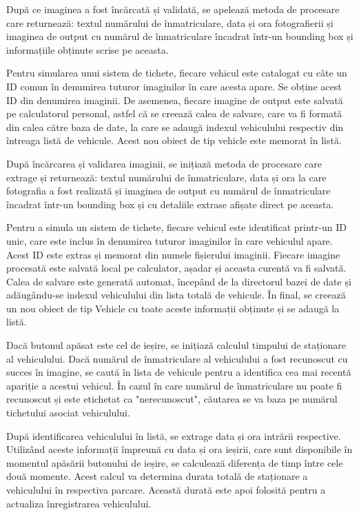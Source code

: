 \documentclass[a4paper,12pt]{report}
\begin{document}
După ce imaginea a fost încărcată și validată, se apelează metoda de procesare care returnează: textul numărului de înmatriculare, data și ora fotografierii și imaginea de output cu numărul de înmatriculare încadrat într-un bounding box și informațiile obținute scrise pe aceasta.

Pentru simularea unui sistem de tichete, fiecare vehicul este catalogat cu câte un ID comun în denumirea tuturor imaginilor în care acesta apare. Se obține acest ID din denumirea imaginii. De asemenea, fiecare imagine de output este salvată pe calculatorul personal, astfel că se creează calea de salvare, care va fi formată din calea către baza de date, la care se adaugă indexul vehiculului respectiv din întreaga listă de vehicule. Acest nou obiect de tip vehicle este memorat în listă.

După încărcarea și validarea imaginii, se inițiază metoda de procesare care extrage și returnează: textul numărului de înmatriculare, data și ora la care fotografia a fost realizată și imaginea de output cu numărul de înmatriculare încadrat într-un bounding box și cu detaliile extrase afișate direct pe aceasta.

Pentru a simula un sistem de tichete, fiecare vehicul este identificat printr-un ID unic, care este inclus în denumirea tuturor imaginilor în care vehiculul apare. Acest ID este extras și memorat din numele fișierului imaginii. Fiecare imagine procesată este salvată local pe calculator, așadar și aceasta curentă va fi salvată. Calea de salvare este generată automat, începând de la directorul bazei de date și adăugându-se indexul vehiculului din lista totală de vehicule. În final, se creează un nou obiect de tip Vehicle cu toate aceste informații obținute și se adaugă la listă.

Dacă butonul apăsat este cel de ieșire, se inițiază calculul timpului de staționare al vehiculului. Dacă numărul de înmatriculare al vehiculului a fost recunoscut cu succes în imagine, se caută în lista de vehicule pentru a identifica cea mai recentă apariție a acestui vehicul. În cazul în care numărul de înmatriculare nu poate fi recunoscut și este etichetat ca "nerecunoscut", căutarea se va baza pe numărul tichetului asociat vehiculului.

După identificarea vehiculului în listă, se extrage data și ora intrării respective. Utilizând aceste informații împreună cu data și ora ieșirii, care sunt disponibile în momentul apăsării butonului de ieșire, se calculează diferența de timp între cele două momente. Acest calcul va determina durata totală de staționare a vehiculului în respectiva parcare. Această durată este apoi folosită pentru a actualiza înregistrarea vehiculului.
\end{document}
